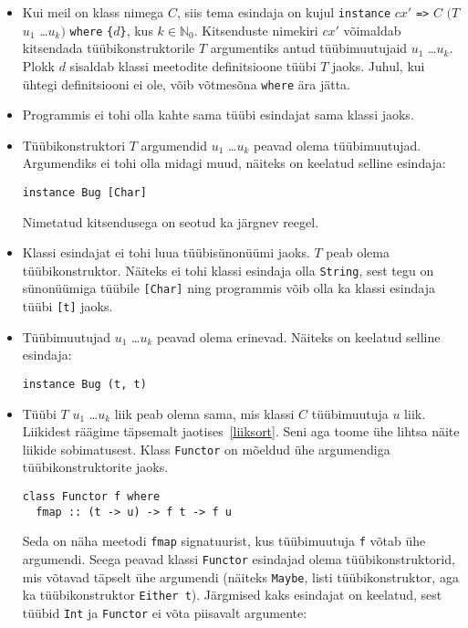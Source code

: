 \documentclass[12pt]{article}
\begin{document}
        \begin{itemize}
          \item
            Kui meil on klass nimega $C$, siis tema esindaja on kujul \verb!instance! $cx'$ \verb!=>! $C$ $(T$ $u_1$ \ldots $u_k)$ \verb!where! \verb!{!$d$\verb!}!, kus $k\in\mathbb{N}_0$. Kitsenduste nimekiri $cx'$ võimaldab kitsendada tüübikonstruktorile $T$ argumentiks antud tüübimuutujaid $u_1$ \ldots $u_k$. Plokk $d$ sisaldab klassi meetodite definitsioone tüübi $T$ jaoks. Juhul, kui ühtegi definitsiooni ei ole, võib võtmesõna \verb!where! ära jätta.
          \item
            Programmis ei tohi olla kahte sama tüübi esindajat sama klassi jaoks.
          \item
            Tüübikonstruktori $T$ argumendid $u_1$ \ldots $u_k$ peavad olema tüübimuutujad. Argumendiks ei tohi olla midagi muud, näiteks on keelatud selline esindaja:

            \begin{verbatim}instance Bug [Char]\end{verbatim}

            Nimetatud kitsendusega on seotud ka järgnev reegel.
          \item
            Klassi esindajat ei tohi luua tüübisünonüümi jaoks. $T$ peab olema tüübikonstruktor. Näiteks ei tohi klassi esindaja olla \verb!String!, sest tegu on sünonüümiga tüübile \verb![Char]! ning programmis võib olla ka klassi esindaja tüübi \verb![t]! jaoks.
          \item
            Tüübimuutujad $u_1$ \ldots $u_k$ peavad olema erinevad. Näiteks on keelatud selline esindaja:

            \begin{verbatim}instance Bug (t, t)\end{verbatim}
          \item
            Tüübi $T$ $u_1$ \ldots $u_k$ liik peab olema sama, mis klassi $C$ tüübimuutuja $u$ liik. Liikidest räägime täpsemalt jaotises~\ref{liiksort}. Seni aga toome ühe lihtsa näite liikide sobimatusest. Klass \verb!Functor! on mõeldud ühe argumendiga tüübikonstruktorite jaoks.

            \begin{verbatim}class Functor f where
  fmap :: (t -> u) -> f t -> f u\end{verbatim}

            Seda on näha meetodi \verb!fmap! signatuurist, kus tüübimuutuja \verb!f! võtab ühe argumendi. Seega peavad klassi \verb!Functor! esindajad olema tüübikonstruktorid, mis võtavad täpselt ühe argumendi (näiteks \verb!Maybe!, listi tüübikonstruktor, aga ka tüübikonstruktor \verb!Either t!). Järgmised kaks esindajat on keelatud, sest tüübid \verb!Int! ja \verb!Functor! ei võta piisavalt argumente:


\end{itemize}
\end{document}
